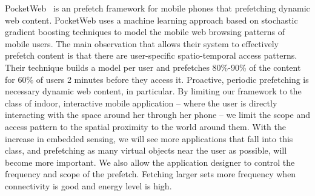PocketWeb~\cite{pocketweb} is an prefetch framework for mobile phones that prefetching dynamic web content.
PocketWeb uses a machine learning approach based on stochastic gradient boosting techniques to model 
the mobile web browsing patterns of mobile users.  The main observation that allows their system to effectively
prefetch content is that there are user-specific spatio-temporal access patterns.  Their technique builds a model
per user and prefetches 80\%-90\% of the content for 60\% of users 2 minutes before they access it.  Proactive, periodic
prefetching is necessary dynamic web content, in particular.  By limiting our framework to the class of indoor, interactive
mobile application -- where the user is directly interacting with the space around her through her phone -- 
we limit the scope and access pattern to the spatial proximity to the world around them.
With the increase in embedded sensing, we will see more applications that fall into this class, and prefetching as many virtual
objects near the user as possible, will become more important.  We also allow the application designer
to control the frequency and scope of the prefetch.  Fetching larger sets more frequency when connectivity is good and
energy level is high.


